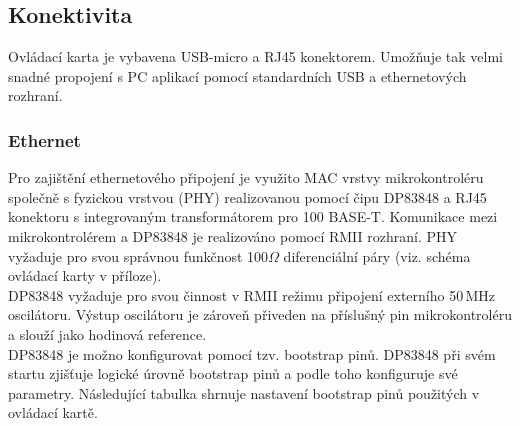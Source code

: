     \subsection{Konektivita}
    Ovládací karta je vybavena USB-micro a RJ45 konektorem. Umožňuje tak velmi snadné propojení s PC aplikací
    pomocí standardních USB a ethernetových rozhraní.

    \subsubsection{Ethernet}
    Pro zajištění ethernetového připojení je využito MAC
    vrstvy mikrokontroléru společně s fyzickou vrstvou (PHY)
    realizovanou pomocí čipu DP83848 a RJ45 konektoru s integrovaným transformátorem pro 100 BASE-T. Komunikace mezi
    mikrokontrolérem a DP83848 je realizováno pomocí RMII rozhraní. PHY vyžaduje pro svou správnou funkčnost
    100$\Omega$ diferenciální páry (viz. schéma ovládací karty v příloze).\\
    
    DP83848 vyžaduje pro svou činnost v RMII režimu připojení externího 50\,MHz oscilátoru.
    Výstup oscilátoru je zároveň přiveden na příslušný pin mikrokontroléru a slouží jako 
    hodinová reference.\\ 

    DP83848 je možno konfigurovat pomocí tzv. bootstrap pinů. DP83848 při svém startu zjišťuje
    logické úrovně bootstrap pinů a podle toho konfiguruje své parametry. Následující tabulka
    shrnuje nastavení bootstrap pinů použitých v ovládací kartě.

    \begin{table}[ht!]
        \caption{Nastavení bootstrap pinů DP83848}
        \label{RMII settings}
        \end{table}


